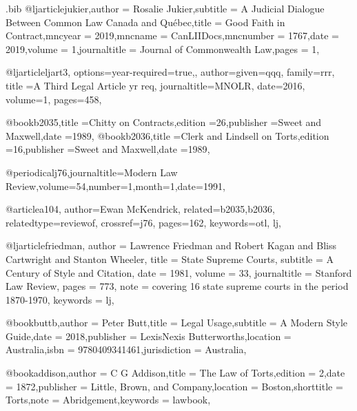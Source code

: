 \begin{filecontents*}[overwrite]{\jobname.bib}
@ljarticle{jukier,author = {Rosalie Jukier},subtitle = {A Judicial Dialogue Between Common Law Canada and Québec},title = {Good Faith in Contract},mncyear = {2019},mncname = {CanLIIDocs},mncnumber = {1767},date = {2019},volume = {1},journaltitle = {Journal of Commonwealth Law},pages = {1},}



@ljarticle{ljart3,
options={year-required=true,},
author={given=qqq, family=rrr},
title ={A Third Legal Article yr req},
journaltitle={MNOLR},
date={2016},
volume={1},
pages={458},
}

@book{b2035,title ={Chitty on Contracts},edition ={26},publisher ={Sweet and Maxwell},date ={1989},}
@book{b2036,title ={Clerk and Lindsell on Torts},edition ={16},publisher ={Sweet and Maxwell},date ={1989},}

@periodical{j76,journaltitle={Modern Law Review},volume={54},number={1},month={1},date={1991},}

@article{a104,
author={Ewan McKendrick},
related={b2035,b2036},
relatedtype={reviewof},
crossref={j76},
pages={162},
keywords={otl, lj},
}




@ljarticle{friedman,
author = {Lawrence Friedman and Robert Kagan and Bliss Cartwright and Stanton Wheeler},
title = {State Supreme Courts},
subtitle = {A Century of Style and Citation},
date = {1981},
volume = {33},
journaltitle = {Stanford Law Review},
pages = {773},
note = {covering 16 state supreme courts in the period 1870-1970},
keywords = {lj},
}




@book{buttb,author = {Peter Butt},title = {Legal Usage},subtitle = {A Modern Style Guide},date = {2018},publisher = {LexisNexis Butterworths},location = {Australia},isbn = {9780409341461},jurisdiction = {Australia},}

@book{addison,author = {C G Addison},title = {The Law of Torts},edition = {2},date = {1872},publisher = {Little, Brown, and Company},location = {Boston},shorttitle = {Torts},note = {Abridgement},keywords = {lawbook},}



\end{filecontents*}
